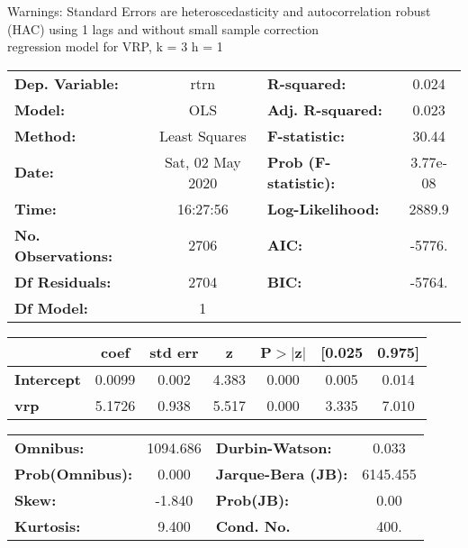 Warnings: \newline
 [1] Standard Errors are heteroscedasticity and autocorrelation robust (HAC) using 1 lags and without small sample correction\\ 

regression model for VRP, k = 3 h = 1\begin{center}
\begin{tabular}{lclc}
\toprule
\textbf{Dep. Variable:}    &       rtrn       & \textbf{  R-squared:         } &     0.024   \\
\textbf{Model:}            &       OLS        & \textbf{  Adj. R-squared:    } &     0.023   \\
\textbf{Method:}           &  Least Squares   & \textbf{  F-statistic:       } &     30.44   \\
\textbf{Date:}             & Sat, 02 May 2020 & \textbf{  Prob (F-statistic):} &  3.77e-08   \\
\textbf{Time:}             &     16:27:56     & \textbf{  Log-Likelihood:    } &    2889.9   \\
\textbf{No. Observations:} &        2706      & \textbf{  AIC:               } &    -5776.   \\
\textbf{Df Residuals:}     &        2704      & \textbf{  BIC:               } &    -5764.   \\
\textbf{Df Model:}         &           1      & \textbf{                     } &             \\
\bottomrule
\end{tabular}
\begin{tabular}{lcccccc}
                   & \textbf{coef} & \textbf{std err} & \textbf{z} & \textbf{P$> |$z$|$} & \textbf{[0.025} & \textbf{0.975]}  \\
\midrule
\textbf{Intercept} &       0.0099  &        0.002     &     4.383  &         0.000        &        0.005    &        0.014     \\
\textbf{vrp}       &       5.1726  &        0.938     &     5.517  &         0.000        &        3.335    &        7.010     \\
\bottomrule
\end{tabular}
\begin{tabular}{lclc}
\textbf{Omnibus:}       & 1094.686 & \textbf{  Durbin-Watson:     } &    0.033  \\
\textbf{Prob(Omnibus):} &   0.000  & \textbf{  Jarque-Bera (JB):  } & 6145.455  \\
\textbf{Skew:}          &  -1.840  & \textbf{  Prob(JB):          } &     0.00  \\
\textbf{Kurtosis:}      &   9.400  & \textbf{  Cond. No.          } &     400.  \\
\bottomrule
\end{tabular}
\end{center}

